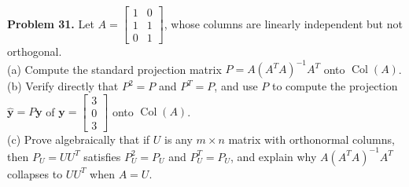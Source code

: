 \documentclass[11pt, letterpaper]{article}
\theoremstyle{definition}
\theoremstyle{remark}
\begin{document}
\textbf{Problem 31.} Let $A = \begin{bmatrix} 1 & 0 \\ 1 & 1 \\ 0 & 1 \end{bmatrix}$, whose columns are linearly independent but not orthogonal. \\
(a) Compute the standard projection matrix $P = A(A^T A)^{-1}A^T$ onto $\operatorname{Col}(A)$. \\
(b) Verify directly that $P^2 = P$ and $P^T = P$, and use $P$ to compute the projection $\hat{\mathbf{y}} = P\mathbf{y}$ of $\mathbf{y} = \begin{bmatrix} 3 \\ 0 \\ 3 \end{bmatrix}$ onto $\operatorname{Col}(A)$. \\
(c) Prove algebraically that if $U$ is any $m \times n$ matrix with orthonormal columns, then $P_U = U U^T$ satisfies $P_U^2 = P_U$ and $P_U^T = P_U$, and explain why $A(A^T A)^{-1} A^T$ collapses to $U U^T$ when $A = U$.
\end{document}
